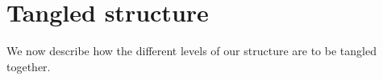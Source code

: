\chapter{Tangled structure}

We now describe how the different levels of our structure are to be tangled together.







